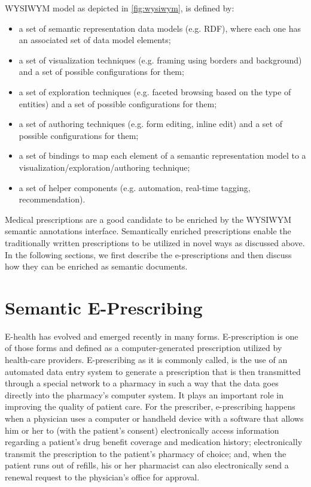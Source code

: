\documentclass[journal]{IEEEtran}
\begin{document}
WYSIWYM model as depicted in \autoref{fig:wysiwym}, is defined by:
\begin{itemize}
	\item a set of semantic representation data models (e.g. RDF), where each one has an associated set of data model elements;
	\item a set of visualization techniques (e.g. framing using borders and background) and a set of possible configurations for them;
	\item a set of exploration techniques (e.g. faceted browsing based on the type of entities) and a set of possible configurations for them;
	\item a set of authoring techniques (e.g. form editing, inline edit) and a set of possible configurations for them;
	\item a set of bindings to map each element of a semantic representation model to a visualization/exploration/authoring technique;
	\item a set of helper components (e.g. automation, real-time tagging, recommendation).
\end{itemize}

Medical prescriptions are a good candidate to be enriched by the WYSIWYM semantic annotations interface.
Semantically enriched prescriptions enable the traditionally written prescriptions to be utilized in novel ways as discussed above.
In the following sections, we first describe the e-prescriptions and then discuss how they can be enriched as semantic documents.

\section{Semantic E-Prescribing}
\label{sec:sep}

E-health has evolved and emerged recently in many forms.
E-prescription is one of those forms and defined as a computer-generated prescription utilized by health-care providers.
E-prescribing as it is commonly called, is the use of an automated data entry system to generate a prescription that is then transmitted through a special network to a pharmacy in such a way that the data goes directly into the pharmacy’s computer system.
It plays an important role in improving the quality of patient care.
For the prescriber, e-prescribing happens when a physician uses a computer or handheld device with a software that allows him or her to (with the patient’s consent) electronically access information regarding a patient’s drug benefit coverage and medication history; electronically transmit the prescription to the patient’s pharmacy of choice; and, when the patient runs out of refills, his or her pharmacist can also electronically send a renewal request to the physician’s office for approval.
\end{document}
